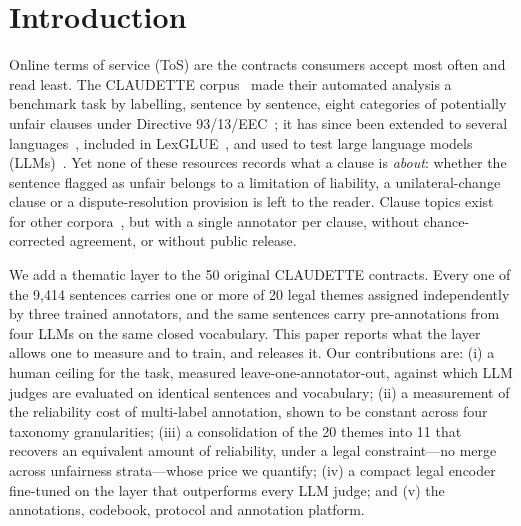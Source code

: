 \documentclass{IOS-Book-Article}
\newcommand{\corpus}{CLAUDETTE}
\begin{document}
\section{Introduction}
Online terms of service (ToS) are the contracts consumers accept most often and read least. The \corpus{} corpus~\cite{lippi2019claudette} made their automated analysis a benchmark task by labelling, sentence by sentence, eight categories of potentially unfair clauses under Directive 93/13/EEC~\cite{eu1993directive}; it has since been extended to several languages~\cite{drawzeski2021corpus,galassi2024multilingual}, included in LexGLUE~\cite{chalkidis2022lexglue}, and used to test large language models (LLMs)~\cite{panarelli2025worth}. Yet none of these resources records what a clause is \emph{about}: whether the sentence flagged as unfair belongs to a limitation of liability, a unilateral-change clause or a dispute-resolution provision is left to the reader. Clause topics exist for other corpora~\cite{braun2022topics,braun2024agbde}, but with a single annotator per clause, without chance-corrected agreement, or without public release.

We add a thematic layer to the 50 original \corpus{} contracts. Every one of the 9,414 sentences carries one or more of 20 legal themes assigned independently by three trained annotators, and the same sentences carry pre-annotations from four LLMs on the same closed vocabulary. This paper reports what the layer allows one to measure and to train, and releases it. Our contributions are: (i) a human ceiling for the task, measured leave-one-annotator-out, against which LLM judges are evaluated on identical sentences and vocabulary; (ii) a measurement of the reliability cost of multi-label annotation, shown to be constant across four taxonomy granularities; (iii) a consolidation of the 20 themes into 11 that recovers an equivalent amount of reliability, under a legal constraint---no merge across unfairness strata---whose price we quantify; (iv) a compact legal encoder fine-tuned on the layer that outperforms every LLM judge; and (v) the annotations, codebook, protocol and annotation platform.
\end{document}
